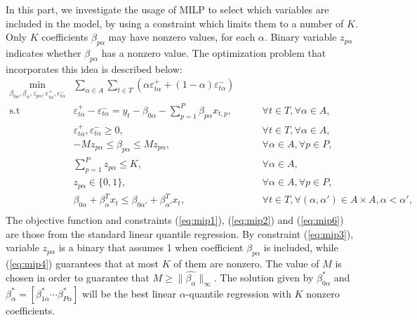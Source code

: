In this part, we investigate the usage of MILP to select which variables are included in the model, by using a constraint which limits them to a number of $K$. Only $K$ coefficients $\beta_{p\alpha}$ may have nonzero values, for each $\alpha$. 
Binary variable $z_{p\alpha}$ indicates whether $\beta_{p\alpha}$ has a nonzero value. 
The optimization problem that incorporates this idea is described below:
\begin{eqnarray}
 \underset{\beta_{0\alpha},\beta_\alpha,z_{p \alpha}, \varepsilon_{t \alpha}^{+},\varepsilon_{t \alpha}^{-}}{\text{min}} & \sum_{\alpha \in A} \sum_{t\in T}\left(\alpha\varepsilon_{t \alpha}^{+}+(1-\alpha)\varepsilon_{t\alpha}^{-}\right) \label{eq:mip0} \\
\mbox{s.t } & \varepsilon_{t \alpha}^{+}-\varepsilon_{t \alpha}^{-}=y_{t}-\beta_{0 \alpha}-\sum_{p=1}^{P}\beta_{p \alpha}x_{t,p},& \qquad\forall t \in T ,\forall \alpha \in A, \label{eq:mip1}\\
& \varepsilon_{t \alpha}^{+},\varepsilon_{t \alpha}^{-}\geq0,&\qquad\forall t \in T ,\forall \alpha \in A, \label{eq:mip2}\\
& - M z_{p \alpha} \leq \beta_{p \alpha} \leq M z_{p \alpha},&\qquad \forall \alpha \in A, \forall p\in P, \label{eq:mip3}\\
& \sum_{p=1}^P z_{p \alpha} \leq K, & \qquad \forall \alpha \in A, \label{eq:mip4}\\
& z_{p \alpha} \in \{0,1\},&\qquad \forall \alpha \in A, \forall p\in P, \label{eq:mip5}\\
& \beta_{0\alpha} + \beta_{\alpha}^T x_{t} \leq \beta_{0\alpha'} + \beta_{\alpha'}^T x_{t}, & \qquad \forall t \in T, \forall (\alpha, \alpha') \in A \times A,  \alpha < \alpha',\nonumber\\ \label{eq:mip6}
\end{eqnarray}
The objective function and constraints (\ref{eq:mip1}), (\ref{eq:mip2}) and (\ref{eq:mip6}) are those from the standard linear quantile regression. 
By constraint (\ref{eq:mip3}), variable $z_{p \alpha}$ is a binary that assumes 1 when coefficient $\beta_{p \alpha}$ is included, while (\ref{eq:mip4}) guarantees that at most $K$ of them are nonzero.
The value of $M$ is chosen in order to guarantee that $M \geq \|\hat{\beta_\alpha}\|_{\infty}$. The solution given by $\beta_{0\alpha}^*$ and $\beta_\alpha^* = [ \beta_{1 \alpha}^* \cdots \beta_{P\alpha}^* ]$ will be the best linear $\alpha$-quantile regression with $K$ nonzero coefficients.  

